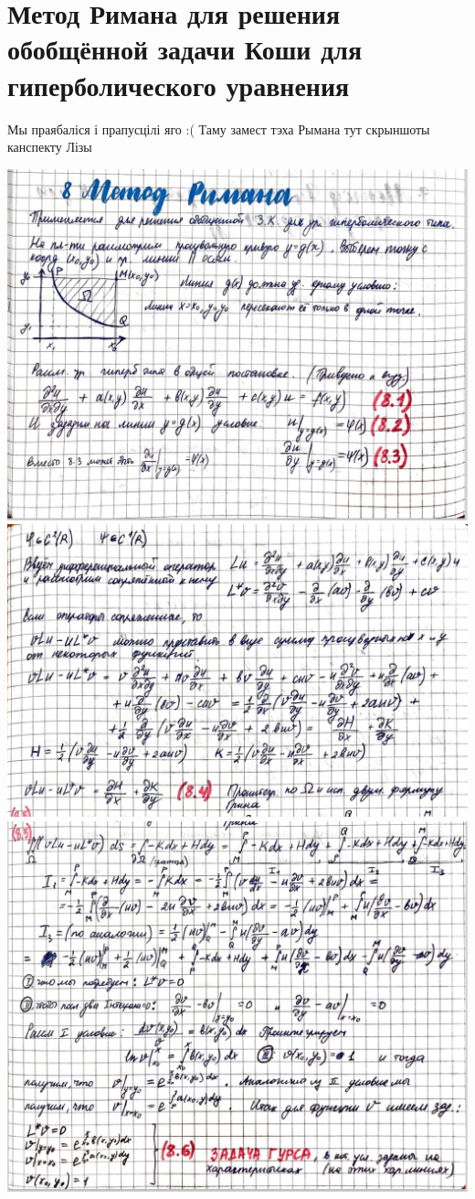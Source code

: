 \documentclass[../main.tex]{subfiles}
\begin{document}
\section{Метод Римана для решения обобщённой задачи Коши для гиперболического уравнения}

Мы праябаліся і прапусцілі яго :( Таму замест тэха Рымана тут скрыншоты канспекту Лізы

\includegraphics[scale=0.7]{Liza_2.7.1.jpg}
\includegraphics[scale=0.7]{Liza_2.7.2.jpg}
\includegraphics[scale=0.7]{Liza_2.7.3.jpg}
\end{document}
